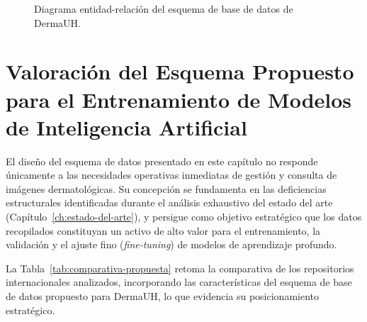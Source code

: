 \begin{figure}[htbp]
{%
}
\caption{Diagrama entidad-relación del esquema de base de datos de DermaUH.}
\label{fig:er_diagram}
\end{figure}

\section{Valoración del Esquema Propuesto para el Entrenamiento de Modelos de Inteligencia Artificial}

El diseño del esquema de datos presentado en este capítulo no responde únicamente a las necesidades operativas inmediatas de gestión y consulta de imágenes dermatológicas. Su concepción se fundamenta en las deficiencias estructurales identificadas durante el análisis exhaustivo del estado del arte (Capítulo~\ref{ch:estado-del-arte}), y persigue como objetivo estratégico que los datos recopilados constituyan un activo de alto valor para el entrenamiento, la validación y el ajuste fino (\textit{fine-tuning}) de modelos de aprendizaje profundo.

La Tabla~\ref{tab:comparativa-propuesta} retoma la comparativa de los repositorios internacionales analizados, incorporando las características del esquema de base de datos propuesto para DermaUH, lo que evidencia su posicionamiento estratégico.

